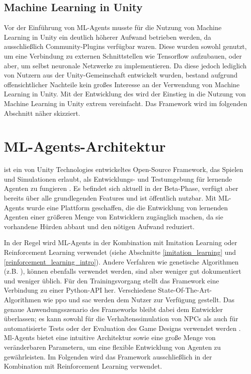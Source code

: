 \subsection{Machine Learning in Unity}
Vor der Einführung von ML-Agents musste für die Nutzung von Machine Learning in Unity ein deutlich höherer Aufwand betrieben werden, da ausschließlich Community-Plugins verfügbar waren. Diese wurden sowohl genutzt, um eine Verbindung zu externen Schnittstellen wie Tensorflow aufzubauen, oder aber, um selbst neuronale Netzwerke zu implementieren. Da diese jedoch lediglich von Nutzern aus der Unity-Gemeinschaft entwickelt wurden, bestand aufgrund offensichtlicher Nachteile kein großes Interesse an der Verwendung von Machine Learning in Unity. Mit der Entwicklung des  wird der Einstieg in die Nutzung von Machine Learning in Unity extrem vereinfacht. Das Framework wird im folgenden Abschnitt näher skizziert.


\section{ML-Agents-Architektur}
 ist ein von Unity Technologies entwickeltes Open-Source Framework, das Spielen und Simulationen erlaubt, als Entwicklungs- und Testumgebung für lernende Agenten zu fungieren \cite{ml-agents_paper} \cite{ml-agents_documentation} \cite{ml-agents_github}. Es befindet sich aktuell in der Beta-Phase, verfügt aber bereits über alle grundlegenden Features und ist öffentlich nutzbar. Mit ML-Agents wurde eine Plattform geschaffen, die die Entwicklung von lernenden Agenten einer größeren Menge von Entwicklern zugänglich machen, da sie vorhandene Hürden abbaut und den nötigen Aufwand reduziert.

In der Regel wird ML-Agents in der Kombination mit Imitation Learning oder Reinforcement Learning verwendet (siehe Abschnitte \ref{imitation_learning} und \ref{reinforcement_learning_intro}). Andere Verfahren wie genetische Algorithmen (z.B. ), können ebenfalls verwendet werden, sind aber weniger gut dokumentiert und weniger üblich. Für den Trainingsvorgang stellt das Framework eine Verbindung zu einer Python-API her. Verschiedene State-Of-The-Art-Algorithmen wie \ac{ppo} und \ac{sac} werden dem Nutzer zur Verfügung gestellt. Das genaue Anwendungsszenario des Frameworks bleibt dabei dem Entwickler überlassen; es kann sowohl für die Verhaltenssimulation von NPCs als auch für automatisierte Tests oder der Evaluation des Game Designs verwendet werden \cite{ml-agents_github}. Ml-Agents bietet eine intuitive Architektur sowie eine große Menge von veränderbaren Parametern, um eine flexible Entwicklung von Agenten zu gewährleisten. Im Folgenden wird das Framework ausschließlich in der Kombination mit Reinforcement Learning verwendet.




